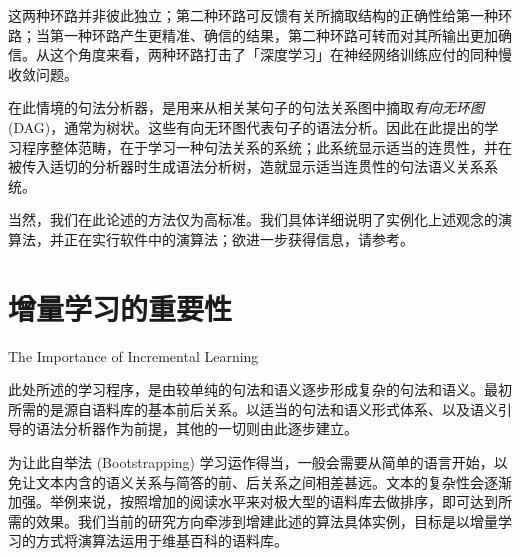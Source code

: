 这两种环路并非彼此独立；第二种环路可反馈有关所摘取结构的正确性给第一种环路；当第一种环路产生更精准、确信的结果，第二种环路可转而对其所输出更加确信。从这个角度来看，两种环路打击了「深度学习」在神经网络训练应付的同种慢收敛问题。

在此情境的句法分析器，是用来从相关某句子的句法关系图中摘取\textit{有向无环图}(DAG)，通常为树状。这些有向无环图代表句子的语法分析。因此在此提出的学习程序整体范畴，在于学习一种句法关系的系统；此系统显示适当的连贯性，并在被传入适切的分析器时生成语法分析树，造就显示适当连贯性的句法语义关系系统。

当然，我们在此论述的方法仅为高标准。我们具体详细说明了实例化上述观念的演算法，并正在实行软件中的演算法；欲进一步获得信息，请参考\cite{Vepstas2013}。

\section{增量学习的重要性}{The Importance of Incremental Learning}

此处所述的学习程序，是由较单纯的句法和语义逐步形成复杂的句法和语义。最初所需的是源自语料库的基本前后关系。以适当的句法和语义形式体系、以及语义引导的语法分析器作为前提，其他的一切则由此逐步建立。

为让此自举法 (Bootstrapping) 学习运作得当，一般会需要从简单的语言开始，以免让文本内含的语义关系与简答的前、后关系之间相差甚远。文本的复杂性会逐渐加强。举例来说，按照增加的阅读水平来对极大型的语料库去做排序，即可达到所需的效果。我们当前的研究方向牵涉到增建此述的算法具体实例，目标是以增量学习的方式将演算法运用于维基百科的语料库。
